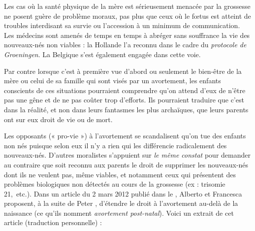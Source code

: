  Les cas où la santé physique de la mère est sérieusement menacée par la grossesse ne posent guère de problème moraux, pas plus que ceux où le fœtus est atteint de troubles interdisant sa survie ou l'accession à un minimum de communication. Les médecins sont amenés de temps en temps à abréger sans souffrance la vie des nouveaux-nés non viables : la Hollande l'a reconnu dans le cadre du \emph{protocole de Groeningen}. La Belgique s'est également engagée dans cette voie. 
 
 Par contre lorsque c'est à première vue d'abord ou seulement le bien-être de la mère ou celui de sa famille qui sont visés par un avortement, les enfants conscients de ces situations pourraient comprendre qu'on attend d'eux de n'être pas une gêne et de ne pas coûter trop d'efforts. Ils pourraient traduire que c'est dans la réalité, et non dans leurs fantasmes les plus archaïques, que leurs parents ont sur eux droit de vie ou de mort.

 Les opposants (« pro-vie ») à l'avortement se scandalisent qu'on tue des enfants non nés puisque selon eux il n'y a rien qui les différencie radicalement des nouveaux-nés. D'autres moralistes s'appuient sur  \emph{le même constat} pour demander au contraire que soit reconnu aux parents le droit de supprimer les nouveaux-nés dont ils ne veulent pas, même viables, et notamment ceux qui présentent des problèmes biologiques non détectés au cours de la grossesse (ex : trisomie 21,~etc.). Dans un article du 2 mars 2012 publié dans le , Alberto  et Francesca  proposent, à la suite de Peter , d'étendre le droit à l'avortement au-delà de la naissance (ce qu'ils nomment \emph{avortement post-natal}). Voici un extrait de cet article (traduction personnelle) :

